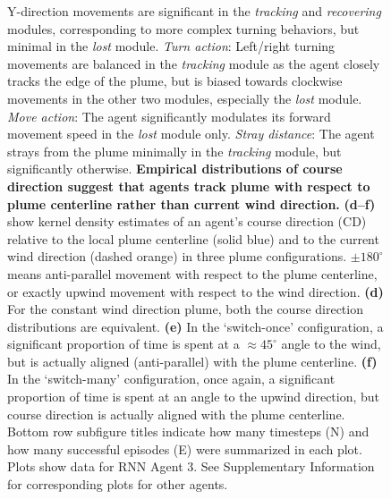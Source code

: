 \documentclass[5p,twocolumn,authoryear]{elsarticle}
\begin{document}
\begin{figure}[h!]
\begin{center}
{Y-direction movements are significant in the \textit{tracking} and \textit{recovering} modules, corresponding to more complex turning behaviors, but minimal in the \textit{lost} module.
\textit{Turn action}: Left/right turning movements are balanced in the \textit{tracking} module as the agent closely tracks the edge of the plume, but is biased towards clockwise movements in the other two modules, especially the \textit{lost} module.
\textit{Move action}: The agent significantly modulates its forward movement speed in the \textit{lost} module only.
\textit{Stray distance}: The agent strays from the plume minimally in the \textit{tracking} module, but significantly otherwise.   
\textbf{Empirical distributions of course direction suggest that agents track plume with respect to plume centerline rather than current wind direction.}
\textbf{(d--f)} show kernel density estimates of an agent's course direction (CD) relative to the local plume centerline (solid blue) and to the current wind direction (dashed orange) in three plume configurations.
$\pm180^{\circ}$ means anti-parallel movement with respect to the plume centerline, or exactly upwind movement with respect to the wind direction.
\textbf{(d)}
For the constant wind direction plume, both the course direction distributions are equivalent.
\textbf{(e)}
In the `switch-once' configuration, a significant proportion of time is spent at a $\approx45^{\circ}$ angle to the wind, but is actually aligned (anti-parallel) with the plume centerline.
\textbf{(f)}
In the `switch-many' configuration, once again,
a significant proportion of time is spent at an angle to the upwind direction, but course direction is actually aligned with the plume centerline.
Bottom row subfigure titles indicate how many timesteps (N) and how many successful episodes (E) were summarized in each plot.
Plots show data for RNN Agent 3. 
See Supplementary Information for corresponding plots for other agents.
}
\label{fig_regimes_coursedir}
\end{center}
\end{figure}







\end{document}
